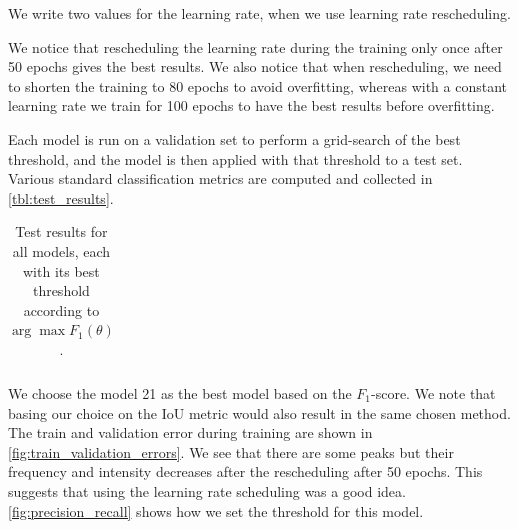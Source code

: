 \documentclass[10pt,conference]{IEEEtran}
\begin{document}
\begin{center}
\begin{tabular}{||c | c  | c | c | c ||}
        \hline
    \end{tabular}
\end{center}
We write two values for the learning rate, when we use learning rate rescheduling. 

We notice that rescheduling the learning rate during the training only once after 50 epochs gives the best results.
We also notice that when rescheduling, we need to shorten the training to 80 epochs to avoid overfitting,
whereas with a constant learning rate we train for 100 epochs to have the best results before overfitting.

Each model is run on a validation set to perform a grid-search of the best threshold,
and the model is then applied with that threshold to a test set.
Various standard classification metrics are computed and collected in \autoref{tbl:test_results}.

\begin{table}
    \begin{center}
        \begin{tabular}{||c | c c c c||}
             \hline
             
        \end{tabular}
    \end{center}
    \caption{Test results for all models, each with its best threshold according to $\arg\max F_1(\theta)$.
    }
    \label{tbl:test_results}
\end{table}

We choose the model 21 as the best model based on the $F_1$-score. We note that basing our choice on the IoU metric would also result in the same chosen method. The train and validation error during training are shown in \autoref{fig:train_validation_errors}. We see that there are some peaks but their frequency and intensity decreases after the rescheduling after 50 epochs. This suggests that using the learning rate scheduling was a good idea. \autoref{fig:precision_recall} shows how we set the threshold for this model.
\end{document}
